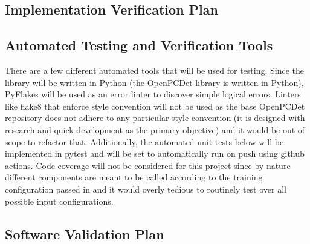 \documentclass[12pt, titlepage]{article}
\begin{document}
\subsection{Implementation Verification Plan}




\subsection{Automated Testing and Verification Tools}

There are a few different automated tools that will be used for testing.
Since the library will be written in Python (the OpenPCDet library
is written in Python), PyFlakes will be used as an error linter to discover
simple logical errors. Linters like flake8 that enforce style convention will
not be used as the base OpenPCDet repository does not adhere to any particular
style convention (it is designed with research and quick development as the primary
objective) and it would be out of scope to refactor that. Additionally, the automated
unit tests below will be implemented in pytest and will be set to automatically run
on push using github actions. Code coverage will not be considered for this project
since by nature different components are meant to be called according to the training
configuration passed in and it would overly tedious to routinely test over all possible
input configurations.

\subsection{Software Validation Plan}




\end{document}
